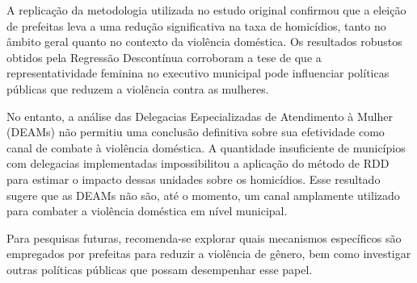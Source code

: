 A replicação da metodologia utilizada no estudo original confirmou que a eleição de prefeitas leva a uma redução significativa na taxa de homicídios, tanto no âmbito geral quanto no contexto da violência doméstica. Os resultados robustos obtidos pela Regressão Descontínua corroboram a tese de que a representatividade feminina no executivo municipal pode influenciar políticas públicas que reduzem a violência contra as mulheres.

No entanto, a análise das Delegacias Especializadas de Atendimento à Mulher (DEAMs) não permitiu uma conclusão definitiva sobre sua efetividade como canal de combate à violência doméstica. A quantidade insuficiente de municípios com delegacias implementadas impossibilitou a aplicação do método de RDD para estimar o impacto dessas unidades sobre os homicídios. Esse resultado sugere que as DEAMs não são, até o momento, um canal amplamente utilizado para combater a violência doméstica em nível municipal.

Para pesquisas futuras, recomenda-se explorar quais mecanismos específicos são empregados por prefeitas para reduzir a violência de gênero, bem como investigar outras políticas públicas que possam desempenhar esse papel.



\printbibliography[keyword = close-election]
